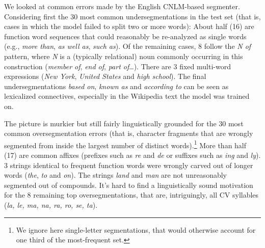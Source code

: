 
We looked at common errors made by the English CNLM-based segmenter. Considering first the 30 most common undersegmentations
in the test set (that is, cases in which the model failed to split two
or more words): About half (16) are function word
sequences that could reasonably be re-analyzed as single words (e.g.,
\emph{more than}, \emph{as well as}, \emph{such as}). Of the remaining
cases, 8 follow the \emph{N of} pattern, where \emph{N} is a
(typically relational) noun commonly occurring in this construction
(\emph{member of}, \emph{end of}, \emph{part of}\ldots). There are 3
fixed multi-word expressions (\emph{New York}, \emph{United States}
and \emph{high school}). The final undersegmentations \emph{based on}, \emph{known as} and
\emph{according to} can be seen as lexicalized connectives,
especially in the Wikipedia text the model was trained on.

The picture is murkier but still fairly linguistically grounded
for the 30 most common oversegmentation errors (that is, character
fragments that are wrongly segmented from inside the largest number of
distinct words).\footnote{We ignore here single-letter segmentations,
  that would otherwise account for one third of the most-frequent
  set.}  More than half (17) are common affixes (prefixes such as
\emph{re} and \emph{de} or suffixes such as \emph{ing} and
\emph{ly}). 3 strings identical to frequent
function words were wrongly carved out of longer words (\emph{the},
\emph{to} and \emph{on}). %
The strings \emph{land} and \emph{man} are not unreasonably segmented
out of compounds. It's hard to find a linguistically sound motivation
for the 8 remaining top oversegmentations, that are, intriguingly, all CV
syllables (\emph{la, le, ma, na, ra, ro, se, ta}).


